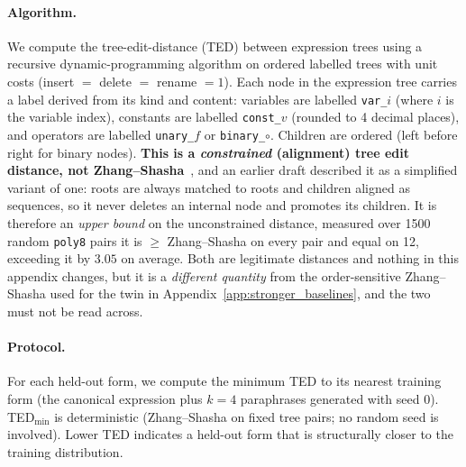 \paragraph{Algorithm.} We compute the tree-edit-distance (TED) between expression trees using a recursive dynamic-programming algorithm on ordered labelled trees with unit costs (insert $= $ delete $= $ rename $= 1$). Each node in the expression tree carries a label derived from its kind and content: variables are labelled \texttt{var\_$i$} (where $i$ is the variable index), constants are labelled \texttt{const\_$v$} (rounded to 4 decimal places), and operators are labelled \texttt{unary\_$f$} or \texttt{binary\_$\circ$}. Children are ordered (left before right for binary nodes). \textbf{This is a \emph{constrained} (alignment) tree edit distance, not Zhang--Shasha}~\citep{zhang1989simple}, and an earlier draft described it as a simplified variant of one: roots are always matched to roots and children aligned as sequences, so it never deletes an internal node and promotes its children. It is therefore an \emph{upper bound} on the unconstrained distance, measured over 1500 random \texttt{poly8} pairs it is $\geq$ Zhang--Shasha on every pair and equal on 12, exceeding it by $3.05$ on average. Both are legitimate distances and nothing in this appendix changes, but it is a \emph{different quantity} from the order-sensitive Zhang--Shasha used for the twin in Appendix~\ref{app:stronger_baselines}, and the two must not be read across.

\paragraph{Protocol.} For each held-out form, we compute the minimum TED to its nearest training form (the canonical expression plus $k{=}4$ paraphrases generated with seed 0). TED$_{\min}$ is deterministic (Zhang--Shasha on fixed tree pairs; no random seed is involved). Lower TED indicates a held-out form that is structurally closer to the training distribution.

